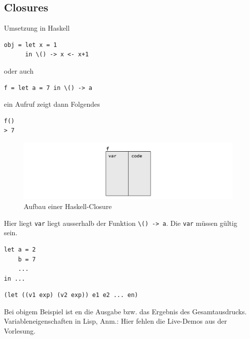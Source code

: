 	\subsection{Closures} %
	\label{sub:closures}
	
	Umsetzung in Haskell

	\lstHaskell
	\begin{lstlisting}
obj = let x = 1
      in \() -> x <- x+1
	\end{lstlisting}



		oder auch

		\lstHaskell
		\begin{lstlisting}
f = let a = 7 in \() -> a
		\end{lstlisting}

		ein Aufruf zeigt dann Folgendes

		\lstHaskell
		\begin{lstlisting}
f()
> 7
		\end{lstlisting}

		\begin{figure}[hb]
			\caption{Aufbau einer Haskell-Closure}
			\includegraphics[width=\textwidth]{workfiles/v11_1}
		\end{figure}
		Hier liegt \texttt{var} liegt ausserhalb der Funktion \texttt{\textbackslash() -> a}. Die \texttt{var} müssen gültig sein.

		\begin{lstlisting}
let a = 2
    b = 7
    ...
in ...
		\end{lstlisting}

		\begin{lstlisting}
(let ((v1 exp) (v2 exp)) e1 e2 ... en)
		\end{lstlisting}

		Bei obigem Beispiel ist en die Ausgabe bzw. das Ergebnis des Gesamtausdrucks.\\

		Variableneigenschaften in Lisp, Anm.: Hier fehlen die Live-Demos aus der Vorlesung.\\

